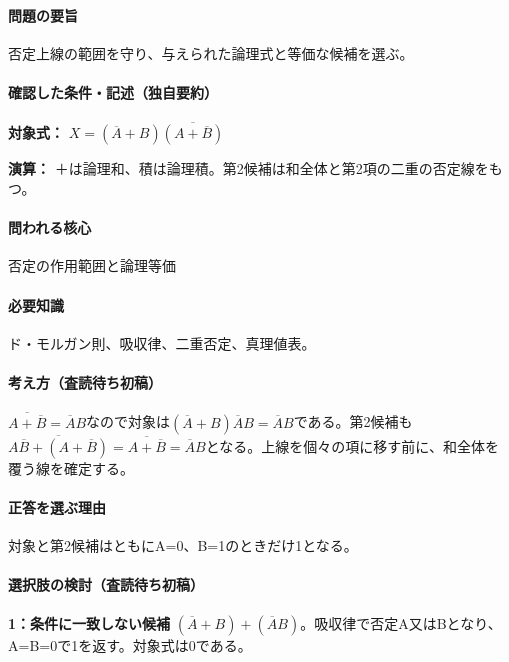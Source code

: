 \paragraph{問題の要旨} 否定上線の範囲を守り、与えられた論理式と等価な候補を選ぶ。

\paragraph{確認した条件・記述（独自要約）}\mbox{}\par

\noindent\textbf{対象式：} \(X=(\overline A+B)\overline{(A+\overline B)}\)\par

\noindent\textbf{演算：} ＋は論理和、積は論理積。第2候補は和全体と第2項の二重の否定線をもつ。\par

\paragraph{問われる核心} 否定の作用範囲と論理等価

\paragraph{必要知識} ド・モルガン則、吸収律、二重否定、真理値表。

\paragraph{考え方（査読待ち初稿）} \(\overline{A+\overline B}=\overline A B\)なので対象は\((\overline A+B)\overline A B=\overline A B\)である。第2候補も\(\overline{A\overline B+(A+\overline B)}=\overline{A+\overline B}=\overline A B\)となる。上線を個々の項に移す前に、和全体を覆う線を確定する。

\paragraph{正答を選ぶ理由} 対象と第2候補はともにA=\allowbreak{}0、B=\allowbreak{}1のときだけ1となる。

\paragraph{選択肢の検討（査読待ち初稿）}\mbox{}\par

\noindent\textbf{1：条件に一致しない候補} \((\overline A+B)+(\overline A B)\)。吸収律で否定A又はBとなり、A=\allowbreak{}B=\allowbreak{}0で1を返す。対象式は0である。\par


